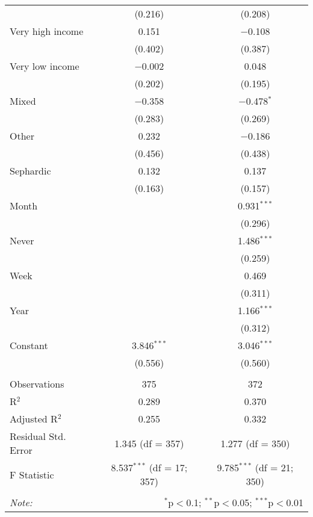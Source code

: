 \documentclass[12pt,letterpaper]{article}
\begin{document}
\begin{table}[!htbp]
\begin{tabular}{@{\extracolsep{5pt}}lcc}
		& (0.216) & (0.208) \\ 
		Very high income & 0.151 & $-$0.108 \\ 
		& (0.402) & (0.387) \\ 
		Very low income & $-$0.002 & 0.048 \\ 
		& (0.202) & (0.195) \\ 
		Mixed & $-$0.358 & $-$0.478$^{*}$ \\ 
		& (0.283) & (0.269) \\ 
		Other & 0.232 & $-$0.186 \\ 
		& (0.456) & (0.438) \\ 
		Sephardic & 0.132 & 0.137 \\ 
		& (0.163) & (0.157) \\ 
		Month &  & 0.931$^{***}$ \\ 
		&  & (0.296) \\ 
		Never &  & 1.486$^{***}$ \\ 
		&  & (0.259) \\ 
		Week &  & 0.469 \\ 
		&  & (0.311) \\ 
		Year &  & 1.166$^{***}$ \\ 
		&  & (0.312) \\ 
		Constant & 3.846$^{***}$ & 3.046$^{***}$ \\ 
		& (0.556) & (0.560) \\ 
		\hline \\[-1.8ex] 
		Observations & 375 & 372 \\ 
		R$^{2}$ & 0.289 & 0.370 \\ 
		Adjusted R$^{2}$ & 0.255 & 0.332 \\ 
		Residual Std. Error & 1.345 (df = 357) & 1.277 (df = 350) \\ 
		F Statistic & 8.537$^{***}$ (df = 17; 357) & 9.785$^{***}$ (df = 21; 350) \\ 
		\hline 
		\hline \\[-1.8ex] 
		\textit{Note:}  & \multicolumn{2}{r}{$^{*}$p$<$0.1; $^{**}$p$<$0.05; $^{***}$p$<$0.01} \\ 
	\end{tabular} 
\end{table} 
\end{document}
